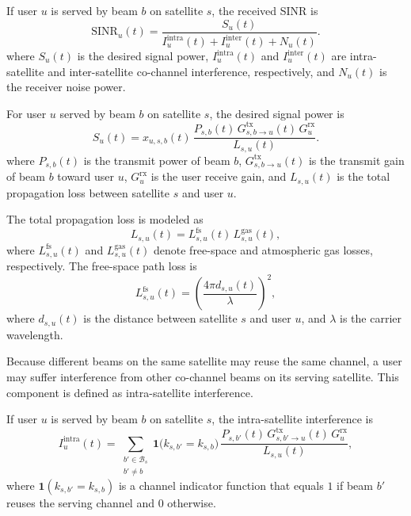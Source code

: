 If user $u$ is served by beam $b$ on satellite $s$, the received SINR is
\begin{equation}
\mathrm{SINR}_u(t)=\frac{S_u(t)}{I_u^{\mathrm{intra}}(t)+I_u^{\mathrm{inter}}(t)+N_u(t)}.
\label{eq:ch3_SINR}
\end{equation}
where $S_u(t)$ is the desired signal power, $I_u^{\mathrm{intra}}(t)$ and $I_u^{\mathrm{inter}}(t)$ are intra-satellite and inter-satellite co-channel interference, respectively, and $N_u(t)$ is the receiver noise power.

For user $u$ served by beam $b$ on satellite $s$, the desired signal power is
\begin{equation*}
S_u(t)=x_{u,s,b}(t)\,\frac{P_{s,b}(t)\,G^{\mathrm{tx}}_{s,b\to u}(t)\,G^{\mathrm{rx}}_u}{L_{s,u}(t)}.
\end{equation*}
where $P_{s,b}(t)$ is the transmit power of beam $b$, $G^{\mathrm{tx}}_{s,b\to u}(t)$ is the transmit gain of beam $b$ toward user $u$, $G^{\mathrm{rx}}_u$ is the user receive gain, and $L_{s,u}(t)$ is the total propagation loss between satellite $s$ and user $u$.

The total propagation loss is modeled as
\begin{equation*}
L_{s,u}(t)=L_{s,u}^{\mathrm{fs}}(t)\,L_{s,u}^{\mathrm{gas}}(t),
\end{equation*}
where $L_{s,u}^{\mathrm{fs}}(t)$ and $L_{s,u}^{\mathrm{gas}}(t)$ denote free-space and atmospheric gas losses, respectively. The free-space path loss is
\begin{equation*}
L_{s,u}^{\mathrm{fs}}(t)=\left(\frac{4\pi d_{s,u}(t)}{\lambda}\right)^2,
\end{equation*}
where $d_{s,u}(t)$ is the distance between satellite $s$ and user $u$, and $\lambda$ is the carrier wavelength.

Because different beams on the same satellite may reuse the same channel, a user may suffer interference from other co-channel beams on its serving satellite. This component is defined as intra-satellite interference.

If user $u$ is served by beam $b$ on satellite $s$, the intra-satellite interference is
\begin{equation*}
I_u^{\mathrm{intra}}(t)=\sum_{\substack{b'\in\mathcal{B}_s\\ b'\neq b}}
\mathbf{1}\!\bigl(k_{s,b'}=k_{s,b}\bigr)\,
\frac{P_{s,b'}(t)\,G^{\mathrm{tx}}_{s,b'\to u}(t)\,G^{\mathrm{rx}}_u}{L_{s,u}(t)},
\end{equation*}
where $\mathbf{1}(k_{s,b'}=k_{s,b})$ is a channel indicator function that equals $1$ if beam $b'$ reuses the serving channel and $0$ otherwise.

